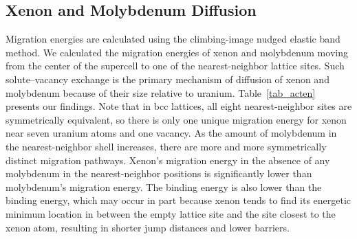 \subsection{Xenon and Molybdenum Diffusion}
Migration energies are calculated using the climbing-image nudged elastic band
method. We calculated the migration energies of xenon and molybdenum moving
from the center of the supercell to one of the nearest-neighbor lattice sites.
Such solute--vacancy exchange is the primary mechanism of diffusion of xenon
and molybdenum because of their size relative to uranium.
Table~\ref{tab_acten} presents our findings.
Note that in bcc lattices, all eight nearest-neighbor sites are symmetrically
equivalent, so there is only one unique migration energy for xenon near seven
uranium atoms and one vacancy.
As the amount of molybdenum in the nearest-neighbor shell increases,
there are more and more symmetrically distinct migration pathways.
Xenon's migration energy in the absence of any molybdenum in the
nearest-neighbor positions is significantly lower than molybdenum's migration
energy.
The  binding energy is also lower than the  binding
energy, which may occur in part because xenon tends to find its energetic
minimum location in between the empty lattice site and the site closest to the
xenon atom, resulting in shorter jump distances and lower barriers. 

